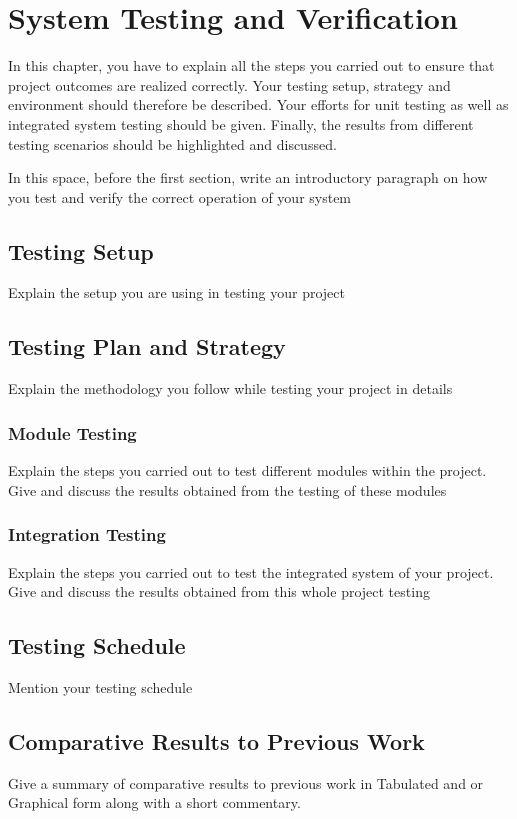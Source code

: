 \chapter{System Testing and Verification}

In this chapter, you have to explain all the steps you carried out to ensure that project outcomes are realized correctly. Your testing setup, strategy and environment should therefore be described. Your efforts for unit testing as well as integrated system testing should be given. Finally, the results from different testing scenarios should be highlighted and discussed. 

In this space, before the first section, write an introductory paragraph on how you test and verify the correct operation of your system

\section{Testing Setup}
Explain the setup you are using in testing your project

\section{Testing Plan and Strategy}
Explain the methodology you follow while testing your project in details

\subsection{Module Testing}
Explain the steps you carried out to test different modules within the project. Give and discuss the results obtained from the testing of these modules

\subsection{Integration Testing}
Explain the steps you carried out to test the integrated system of your project. Give and discuss the results obtained from this whole project testing

\section{Testing Schedule}
Mention your testing schedule

\section{Comparative Results to Previous Work}
   Give a summary of comparative results to previous work in Tabulated and or Graphical form along with a short commentary.
